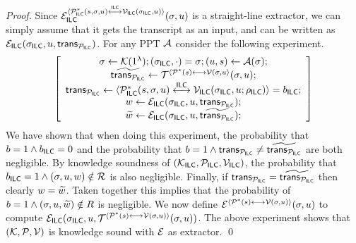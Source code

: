 \begin{proof}
Since $\ExILC^{\langle \PoILC^*(s,\crs,\stm)\ilc\VILC(\crs_\ILC,\stm)\rangle}(\crs,\stm)$ is a straight-line extractor, we can simply assume that it gets the transcript as an input, and can be written as $\ExILC(\crs_\ILC,\stm,\viewpilc)$. 
For any PPT $\A$ consider the following experiment.
\begin{align}
\left[\begin{array}{c} \crs\gets \KK(1^\sep);(\crs_\ILC,\cdot)=\crs;(\stm,s) \gets \A(\crs); \\
\viewpilcsim \gets \Extrans^{\langle \Po^*(s)\std\V(\crs,\stm\rangle}(\crs,u);\\ 
\viewpilc \gets \langle \PoILCMal(s,\crs,\stm)\ilc\VILC(\crs_\ILC,\stm;\rho_{\ILC})\rangle = b_{\ILC};\\ 
\wit\gets \ExILC(\crs_\ILC,\stm,\viewpilc);\\
\witsim\gets \ExILC(\crs_\ILC,\stm,\viewpilcsim);
\end{array}\right]
\end{align}
We have shown that when doing this experiment, the probability that $b=1\wedge b_\ILC=0$ and the probability that $b=1\wedge \viewpilc\neq \viewpilcsim$ are both negligible. By knowledge soundness of $(\KKILC,\PoILC,\VILC)$, the probability that $b_{\ILC}=1\wedge (\crs,\stm,\wit)\notin \R$ is also negligible. Finally, if $\viewpilc =\viewpilcsim$ then clearly $\wit=\witsim$. Taken together this implies that the probability of $b=1\wedge (\crs,\stm,\witsim)\notin R$ is negligible. We now define $\E^{\langle \Po^*(s)\longleftrightarrow \V(\crs,\stm)\rangle}(\crs,\stm)$ to compute $\ExILC(\crs_\ILC,\stm,\Extrans^{\langle \Po^*(s) \longleftrightarrow \V(\crs,\stm)\rangle}(\crs,\stm))$. The above experiment shows that $(\KK,\Po,\V)$ is knowledge sound with $\Ex$ as extractor. \qed
\end{proof}


